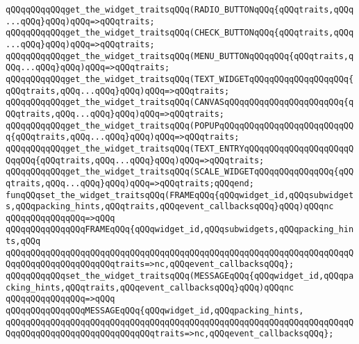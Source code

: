 \verb|qQQqqQQqqQQqget_the_widget_traitsqQQq(RADIO_BUTTONqQQq{qQQqtraits,qQQq...qQQq}qQQq)qQQq=>qQQqtraits;|\newline
\verb|qQQqqQQqqQQqget_the_widget_traitsqQQq(CHECK_BUTTONqQQq{qQQqtraits,qQQq...qQQq}qQQq)qQQq=>qQQqtraits;|\newline
\verb|qQQqqQQqqQQqget_the_widget_traitsqQQq(MENU_BUTTONqQQqqQQq{qQQqtraits,qQQq...qQQq}qQQq)qQQq=>qQQqtraits;|\newline
\verb|qQQqqQQqqQQqget_the_widget_traitsqQQq(TEXT_WIDGETqQQqqQQqqQQqqQQqqQQq{qQQqtraits,qQQq...qQQq}qQQq)qQQq=>qQQqtraits;|\newline
\verb|qQQqqQQqqQQqget_the_widget_traitsqQQq(CANVASqQQqqQQqqQQqqQQqqQQqqQQq{qQQqtraits,qQQq...qQQq}qQQq)qQQq=>qQQqtraits;|\newline
\verb|qQQqqQQqqQQqget_the_widget_traitsqQQq(POPUPqQQqqQQqqQQqqQQqqQQqqQQqqQQq{qQQqtraits,qQQq...qQQq}qQQq)qQQq=>qQQqtraits;|\newline
\verb|qQQqqQQqqQQqget_the_widget_traitsqQQq(TEXT_ENTRYqQQqqQQqqQQqqQQqqQQqqQQqqQQq{qQQqtraits,qQQq...qQQq}qQQq)qQQq=>qQQqtraits;|\newline
\verb|qQQqqQQqqQQqget_the_widget_traitsqQQq(SCALE_WIDGETqQQqqQQqqQQqqQQq{qQQqtraits,qQQq...qQQq}qQQq)qQQq=>qQQqtraits;qQQqend;|\newline
\newline
\newline
\verb|funqQQqset_the_widget_traitsqQQq(FRAMEqQQq{qQQqwidget_id,qQQqsubwidgets,qQQqpacking_hints,qQQqtraits,qQQqevent_callbacksqQQq}qQQq)qQQqnc|\newline
\verb|qQQqqQQqqQQqqQQq=>qQQq|\newline
\verb|qQQqqQQqqQQqqQQqFRAMEqQQq{qQQqwidget_id,qQQqsubwidgets,qQQqpacking_hints,qQQq|\newline
\verb|qQQqqQQqqQQqqQQqqQQqqQQqqQQqqQQqqQQqqQQqqQQqqQQqqQQqqQQqqQQqqQQqqQQqqQQqqQQqqQQqqQQqqQQqqQQqtraits=>nc,qQQqevent_callbacksqQQq};|\newline
\newline
\verb|qQQqqQQqqQQqset_the_widget_traitsqQQq(MESSAGEqQQq{qQQqwidget_id,qQQqpacking_hints,qQQqtraits,qQQqevent_callbacksqQQq}qQQq)qQQqnc|\newline
\verb|qQQqqQQqqQQqqQQq=>qQQq|\newline
\verb|qQQqqQQqqQQqqQQqMESSAGEqQQq{qQQqwidget_id,qQQqpacking_hints,|\newline
\verb|qQQqqQQqqQQqqQQqqQQqqQQqqQQqqQQqqQQqqQQqqQQqqQQqqQQqqQQqqQQqqQQqqQQqqQQqqQQqqQQqqQQqqQQqqQQqqQQqqQQqtraits=>nc,qQQqevent_callbacksqQQq};|\newline
